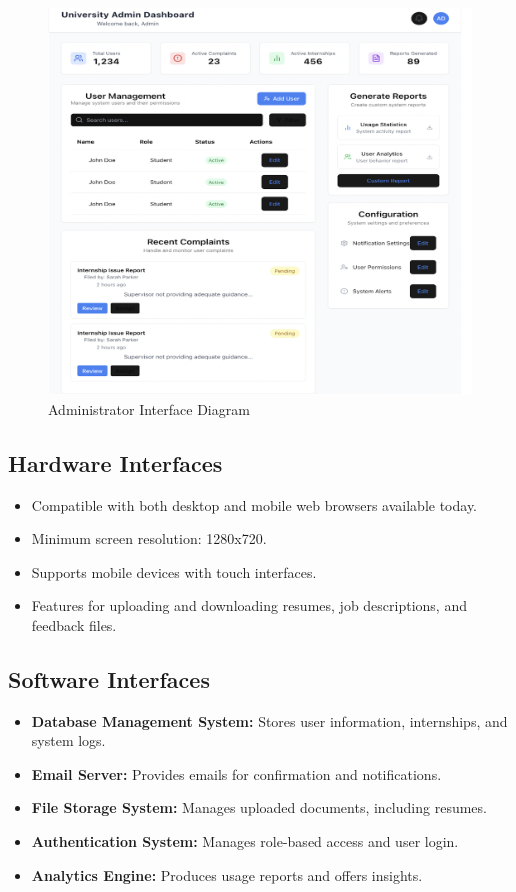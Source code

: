 \begin{figure}[H]
    \begin{center}
        \includegraphics[width=0.82\linewidth]{JhaBhatiaSharma/Images/Mockups/AdminInterface.png}
        \caption{Administrator Interface Diagram}
        \label{fig:AdministratorInterface}%
    \end{center}
\end{figure}

\subsection{Hardware Interfaces}
\label{subsec:hardware_interfaces}%

\begin{itemize}
    \item Compatible with both desktop and mobile web browsers available today.
    \item Minimum screen resolution: 1280x720.
    \item Supports mobile devices with touch interfaces.
    \item Features for uploading and downloading resumes, job descriptions, and feedback files.
\end{itemize}

\subsection{Software Interfaces}
\label{subsec:software_interfaces}%

\begin{itemize}
    \item \textbf{Database Management System:} Stores user information, internships, and system logs.
    \item \textbf{Email Server:} Provides emails for confirmation and notifications.
    \item \textbf{File Storage System:} Manages uploaded documents, including resumes.
    \item \textbf{Authentication System:} Manages role-based access and user login.
    \item \textbf{Analytics Engine:} Produces usage reports and offers insights.
\end{itemize}


